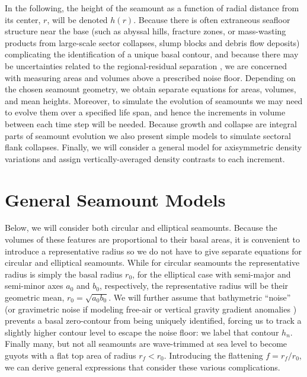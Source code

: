 In the following, the height of the seamount as a function of radial distance from
its center, $r$, will be denoted $h(r)$. Because there is often extraneous seafloor structure near the base
(such as abyssal hills, fracture zones, or mass-wasting products from large-scale sector collapses, slump blocks
and debris flow deposits) complicating the identification of a unique basal contour, and because there may be uncertainties
related to the regional-residual separation \citep[e.g.,~][]{W2016}, we are concerned with measuring areas and volumes
above a prescribed noise floor.  Depending on the chosen seamount geometry, we obtain separate equations for areas,
volumes, and mean heights.  Moreover, to simulate the evolution of seamounts we may need to evolve them over a
specified life span, and hence the increments in volume between each time step will be needed. Because growth
and collapse are integral parts of seamount evolution \citep[e.g.,~][]{HJ2020} we also present simple models to
simulate sectoral flank collapses.  Finally, we will consider a general model for axisymmetric density variations
and assign vertically-averaged density contrasts to each increment.

\section{General Seamount Models}
\label{sec:shape}
Below, we will consider both circular and elliptical seamounts.  Because the volumes of these features are proportional
to their basal areas, it is convenient to introduce a representative radius so we do not have to give
separate equations for circular and elliptical seamounts.  While for circular seamounts the representative
radius is simply the basal radius $r_0$, for the elliptical case with semi-major and semi-minor axes
$a_0$ and $b_0$, respectively, the representative radius will be their geometric mean, $r_0 = \sqrt{a_0 b_0}$.
We will further assume that bathymetric ``noise'' (or gravimetric noise if modeling free-air or vertical gravity
gradient anomalies \citep[e.g.,~][]{WL1997,W2001,KW2011}) prevents a basal zero-contour from being uniquely identified,
forcing us to track a slightly higher contour level to escape the noise floor: we label that contour
$h_n$.  Finally many, but not all seamounts are wave-trimmed at sea level to become guyots with
a flat top area of radius $r_f < r_0$.  Introducing the flattening $f = r_f/r_0$, we can derive general expressions
that consider these various complications.

